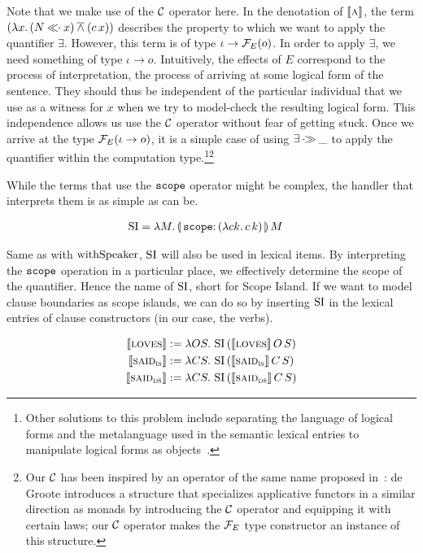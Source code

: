 \documentclass{llncs}
\newcommand{\negSpaceBeforeAlign}{\vspace{-4mm}}
\begin{document}
Note that we make use of the $\mathcal{C}$ operator here. In the denotation of
$\llbracket \textsc{a} \rrbracket$, the term $(\lambda x.\, (N \mathbin{\ll\!\!\cdot} x) \mathbin{\overline{\land}} (c\,x))$
describes the property to which we want to apply the quantifier
$\exists$. However, this term is of type $\iota \to \mathcal{F}_E(o)$. In order to
apply $\exists$, we need something of type $\iota \to o$. Intuitively, the
effects of $E$ correspond to the process of interpretation, the process of
arriving at some logical form of the sentence. They should thus be
independent of the particular individual that we use as a witness for $x$
when we try to model-check the resulting logical form. This independence
allows us use the $\mathcal{C}$ operator without fear of getting stuck. Once we
arrive at the type $\mathcal{F}_E(\iota \to o)$, it is a simple case of using
$\exists \mathbin{\cdot\!\!\gg} \_$ to apply the quantifier within the computation
type.\footnote{Other solutions to this problem include separating the
  language of logical forms and the metalanguage used in the semantic
  lexical entries to manipulate logical forms as
  objects~\cite{kiselyov2015applicative}.}\footnote{Our $\mathcal{C}$ has been
  inspired by an operator of the same name proposed
  in~\cite{de2015conservativity}: de Groote introduces a structure that
  specializes applicative functors in a similar direction as monads by
  introducing the $\mathcal{C}$ operator and equipping it with certain laws; our
  $\mathcal{C}$ operator makes the $\mathcal{F}_E$ type constructor an instance of this
  structure.}

While the terms that use the $\mathtt{scope}$ operator might be complex, the
handler that interprets them is as simple as can be.

\negSpaceBeforeAlign

\begin{align*}
  \SI &= \lam{M}{\ap{\banana{\onto{\op{scope}}{(\lam{c k}{\ap{c}{k}})}}}{M}}
\end{align*}

Same as with $\operatorname{withSpeaker}$, $\operatorname{SI}$ will also be used in lexical items. By
interpreting the $\mathtt{scope}$ operation in a particular place, we
effectively determine the scope of the quantifier. Hence the name of $\operatorname{SI}$,
short for Scope Island. If we want to model clause boundaries as scope
islands, we can do so by inserting $\operatorname{SI}$ in the lexical entries of clause
constructors (in our case, the verbs).

\negSpaceBeforeAlign

\begin{align*}
  \llbracket \textsc{loves} \rrbracket &:= \lambda O S.\, \operatorname{SI}\,(\llbracket \textsc{loves} \rrbracket\,O\,S) \\
  \llbracket \textsc{said}_{\textsc{is}} \rrbracket &:= \lambda C S.\, \operatorname{SI}\,(\llbracket \textsc{said}_{\textsc{is}} \rrbracket\,C\,S) \\
  \llbracket \textsc{said}_{\textsc{ds}} \rrbracket &:= \lambda C S.\, \operatorname{SI}\,(\llbracket \textsc{said}_{\textsc{ds}} \rrbracket\,C\,S)
\end{align*}
\end{document}
